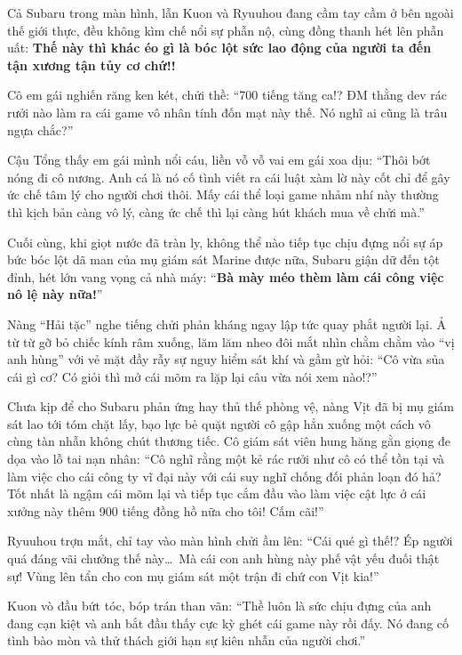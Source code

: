 \documentclass[../main.tex]{subfiles}
\begin{document}
Cả Subaru trong màn hình, lẫn Kuon và Ryuuhou đang cầm tay cầm ở bên ngoài thế giới thực, đều không kìm chế nổi sự phẫn nộ, cùng đồng thanh hét lên phẫn uất: \textbf{Thế này thì khác éo gì là bóc lột sức lao động của người ta đến tận xương tận tủy cơ chứ!!}

\il

Cô em gái nghiến răng ken két, chửi thề: ``700 tiếng tăng ca!? ĐM thằng dev rác rưởi nào làm ra cái game vô nhân tính đốn mạt này thế. Nó nghĩ ai cũng là trâu ngựa chắc?''

Cậu Tổng thấy em gái mình nổi cáu, liền vỗ vỗ vai em gái xoa dịu: ``Thôi bớt nóng đi cô nương. Anh cá là nó cố tình viết ra cái luật xàm lờ này cốt chỉ để gây ức chế tâm lý cho người chơi thôi. Mấy cái thể loại game nhảm nhí này thường thì kịch bản càng vô lý, càng ức chế thì lại càng hút khách mua về chửi mà.''

\il

Cuối cùng, khi giọt nước đã tràn ly, không thể nào tiếp tục chịu đựng nổi sự áp bức bóc lột dã man của mụ giám sát Marine được nữa, Subaru giận dữ đến tột đỉnh, hét lớn vang vọng cả nhà máy: ``\textbf{Bà mày méo thèm làm cái công việc nô lệ này nữa!}''

Nàng ``Hải tặc'' nghe tiếng chửi phản kháng ngay lập tức quay phắt người lại. Ả từ từ gỡ bỏ chiếc kính râm xuống, lăm lăm nheo đôi mắt nhìn chằm chằm vào ``vị anh hùng'' với vẻ mặt đầy rẫy sự nguy hiểm sát khí và gầm gừ hỏi: ``Cô vừa sủa cái gì cơ? Có giỏi thì mở cái mõm ra lặp lại câu vừa nói xem nào!?''

Chưa kịp để cho Subaru phản ứng hay thủ thế phòng vệ, nàng Vịt đã bị mụ giám sát lao tới tóm chặt lấy, bạo lực bẻ quặt người cô gập hẳn xuống một cách vô cùng tàn nhẫn không chút thương tiếc. Cô giám sát viên hung hăng gằn giọng đe dọa vào lỗ tai nạn nhân: ``Cô nghĩ rằng một kẻ rác rưởi như cô có thể tồn tại và làm việc cho cái công ty vĩ đại này với cái suy nghĩ chống đối phản loạn đó hả? Tốt nhất là ngậm cái mõm lại và tiếp tục cắm đầu vào làm việc cật lực ở cái xưởng này thêm 900 tiếng đồng hồ nữa cho tôi! Cấm cãi!''


\il

Ryuuhou trợn mắt, chỉ tay vào màn hình chửi ầm lên: ``Cái qué gì thế!? Ép người quá đáng vãi chưởng thế này\dots\ Mà cái con anh hùng này phế vật yếu đuối thật sự! Vùng lên tẩn cho con mụ giám sát một trận đi chứ con Vịt kia!''

Kuon vò đầu bứt tóc, bóp trán than vãn: ``Thề luôn là sức chịu đựng của anh đang cạn kiệt và anh bắt đầu thấy cực kỳ ghét cái game này rồi đấy. Nó đang cố tình bào mòn và thử thách giới hạn sự kiên nhẫn của người chơi.''
\end{document}
